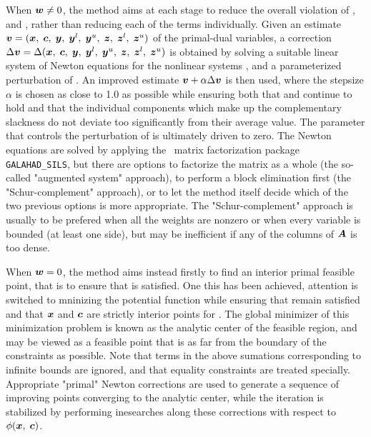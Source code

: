 \documentclass{galahad}
\begin{document}
When ${\bm{w}} \neq 0$, the method aims at each stage to reduce the
overall violation of ,  and , 
rather than reducing each of the terms individually. Given an estimate 
${\bm{v}} = ({\bm{x}}, \; {\bm{c}}, \; {\bm{y}}, \; {\bm{y}}^{l}, \;
{\bm{y}}^{u}, \; {\bm{z}}, \; {\bm{z}}^{l}, \; {\bm{z}}^{u})$
of the primal-dual variables, a correction
$\Delta {\bm{v}} = \Delta ({\bm{x}}, \; {\bm{c}}, \; {\bm{y}}, \; {\bm{y}}^{l},
 \; {\bm{y}}^{u} ,\;{\bm{z}},\;{\bm{z}}^{l} ,\;{\bm{z}}^{u} )$
is obtained by solving a suitable linear system of Newton equations for the
nonlinear systems ,  and a parameterized perturbation of 
. An improved estimate ${\bm{v}} + \alpha \Delta {\bm{v}}$ 
is then used, where the stepsize $\alpha$
is chosen as close to 1.0 as possible while ensuring both that
 and  continue to hold and that the individual components
which make up the complementary slackness 
 do not deviate too significantly
from their average value. The parameter that controls the perturbation
of  is ultimately driven to zero.
The Newton equations are solved  by applying the 
\galahad\ matrix factorization package 
{\tt GALAHAD\_SILS}, but there are options 
to factorize the matrix as a whole (the so-called "augmented system"
approach), to perform a block elimination first (the "Schur-complement"
approach), or to let the method itself decide which of the two
previous options is more appropriate.
The "Schur-complement" approach is usually to be prefered when all the
weights are nonzero or when every variable is bounded (at least one side),
but may be inefficient if any of the columns of ${\bm{A}}$ is too dense.

When ${\bm{w}} = 0$, the method aims instead firstly to find an interior 
primal feasible point, that is to ensure that  is satisfied. 
One this has been achieved, attention is switched to mninizing the
potential function
while ensuring that  remain satisfied and that 
${\bm{x}}$ and ${\bm{c}}$ are strictly interior points for . 
The global minimizer of this minimization problem is known as the
analytic center of the feasible region, and may be viewed as
a feasible point that is as far from the boundary of the constraints as 
possible.
Note that terms in the above sumations corresponding to infinite bounds are
ignored, and that equality constraints are treated specially.
Appropriate "primal" Newton corrections are used to generate a sequence
of improving points converging to the analytic center, while the iteration
is stabilized by performing inesearches along these corrections with respect to
$\phi ({\bm{x}},\;{\bm{c}})$.
\end{document}
